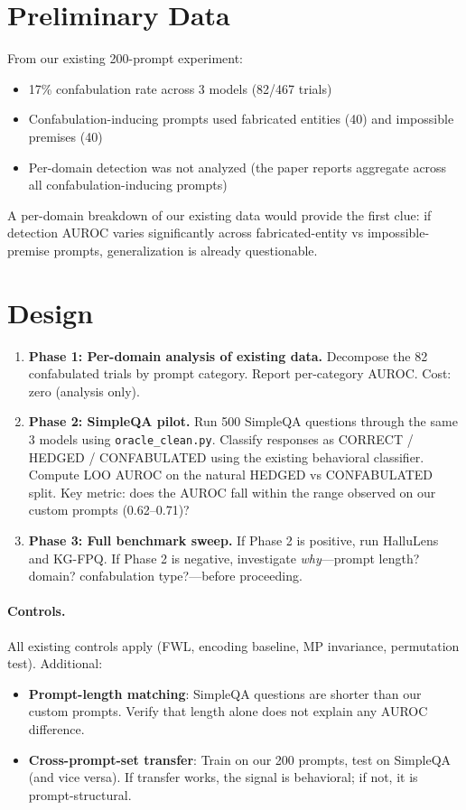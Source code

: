 \documentclass[11pt,letterpaper]{article}
\begin{document}
\section{Preliminary Data}

From our existing 200-prompt experiment:
\begin{itemize}
  \item 17\% confabulation rate across 3 models (82/467 trials)
  \item Confabulation-inducing prompts used fabricated entities (40)
    and impossible premises (40)
  \item Per-domain detection was not analyzed (the paper reports
    aggregate across all confabulation-inducing prompts)
\end{itemize}

\noindent A per-domain breakdown of our existing data would provide
the first clue: if detection AUROC varies significantly across
fabricated-entity vs impossible-premise prompts, generalization is
already questionable.

\section{Design}

\begin{enumerate}[leftmargin=*]
  \item \textbf{Phase 1: Per-domain analysis of existing data.}
    Decompose the 82 confabulated trials by prompt category. Report
    per-category AUROC. Cost: zero (analysis only).

  \item \textbf{Phase 2: SimpleQA pilot.} Run 500 SimpleQA questions
    through the same 3 models using \texttt{oracle\_clean.py}.
    Classify responses as CORRECT / HEDGED / CONFABULATED using the
    existing behavioral classifier. Compute LOO AUROC on the natural
    HEDGED vs CONFABULATED split. Key metric: does the AUROC fall
    within the range observed on our custom prompts (0.62--0.71)?

  \item \textbf{Phase 3: Full benchmark sweep.} If Phase 2 is
    positive, run HalluLens and KG-FPQ. If Phase 2 is negative,
    investigate \emph{why}---prompt length? domain? confabulation
    type?---before proceeding.
\end{enumerate}

\paragraph{Controls.} All existing controls apply (FWL, encoding
baseline, MP invariance, permutation test). Additional:
\begin{itemize}
  \item \textbf{Prompt-length matching}: SimpleQA questions are
    shorter than our custom prompts. Verify that length alone does
    not explain any AUROC difference.
  \item \textbf{Cross-prompt-set transfer}: Train on our 200 prompts,
    test on SimpleQA (and vice versa). If transfer works, the signal
    is behavioral; if not, it is prompt-structural.
\end{itemize}
\end{document}
